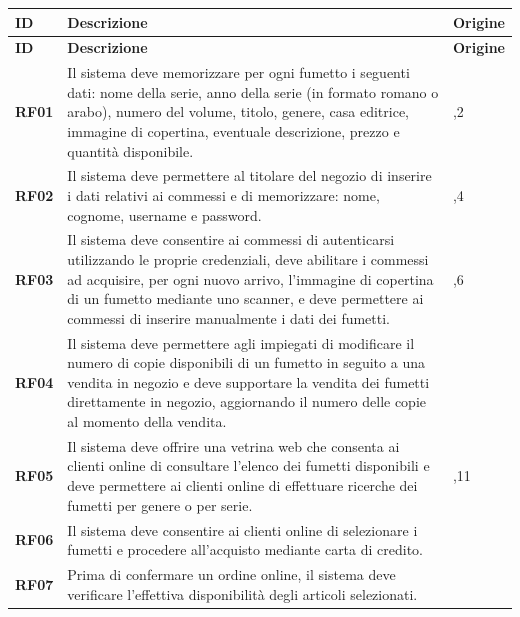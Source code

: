 \documentclass[12pt, a4paper]{article}
\begin{document}
\begin{longtable}{|
    >{\centering\arraybackslash}m{} |   %
    >{\raggedright\arraybackslash}m{} | %
    >{\centering\arraybackslash}m{} |   %
}
\hline
\textbf{ID} & \textbf{Descrizione} & \textbf{Origine} \\
\hline
\endfirsthead

\hline
\textbf{ID} & \textbf{Descrizione} & \textbf{Origine} \\
\hline
\endhead

\textbf{RF01} & Il sistema deve memorizzare per ogni fumetto i seguenti dati: nome della serie,  
anno della serie (in formato romano o arabo), numero del volume, titolo, genere, casa editrice,  
immagine di copertina, eventuale descrizione, prezzo e quantità disponibile. & 1,2 \\
\hline
\textbf{RF02} & Il sistema deve permettere al titolare del negozio di inserire i dati relativi ai commessi  
e di memorizzare: nome, cognome, username e password. & 3,4 \\
\hline
\textbf{RF03} & Il sistema deve consentire ai commessi di autenticarsi utilizzando le proprie credenziali,  
deve abilitare i commessi ad acquisire, per ogni nuovo arrivo, l’immagine di copertina di un fumetto  
mediante uno scanner, e deve permettere ai commessi di inserire manualmente i dati dei fumetti. & 5,6 \\
\hline
\textbf{RF04} & Il sistema deve permettere agli impiegati di modificare il numero di copie disponibili di un fumetto  
in seguito a una vendita in negozio e deve supportare la vendita dei fumetti direttamente in negozio,  
aggiornando il numero delle copie al momento della vendita. & 8 \\
\hline
\textbf{RF05} & Il sistema deve offrire una vetrina web che consenta ai clienti online di consultare  
l’elenco dei fumetti disponibili e deve permettere ai clienti online di effettuare ricerche dei fumetti  
per genere o per serie. & 10,11 \\
\hline
\textbf{RF06} & Il sistema deve consentire ai clienti online di selezionare i fumetti e procedere  
all’acquisto mediante carta di credito. & 12 \\
\hline
\textbf{RF07} & Prima di confermare un ordine online, il sistema deve verificare l’effettiva disponibilità  
degli articoli selezionati. & 13 \\
\hline

\end{longtable}
\end{document}
